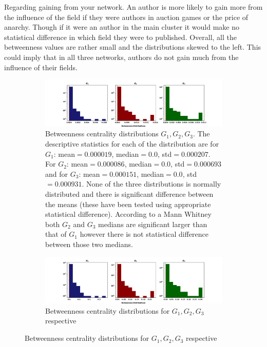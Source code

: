 \documentclass{article}
\theoremstyle{definition}
\begin{document}
Regarding gaining from your network. An author is more likely to gain more
from the influence of the field if they were authors in auction games or the
price of anarchy. Though if it were an author in the main cluster it would make
no statistical difference in which field they were to published. Overall,
all the betweenness values are rather small and the distributions skewed to the
left. This could imply that in all three networks, authors do not gain much from
the influence of their fields.

\begin{figure}[!hbtp]
    \centering
    \begin{subfigure}{\textwidth}\centering
        \includegraphics[width=\textwidth]{./assets/images/betweeness_distributions.pdf}
        \caption{Betweenness centrality distributions \(G_1, G_2, G_3\). The descriptive
        statistics for each of the distribution are for \(G_1\): mean\(=0.000019\),
        median\(=0.0\), std\(=0.000207\). For \(G_2\): mean\(=0.000086\), median\(=0.0\),
        std\(=0.000693\) and for \(G_3\): mean\(=0.000151\), median\(=0.0\), std\(=0.000931\).
        None of the three distributions is normally distributed and there is
        significant difference between the means (these have been tested using
        appropriate statistical difference). According to a Mann Whitney both
        \(G_2\) and \(G_3\) medians are significant larger than that of \(G_1\) however there
        is not statistical difference between those two medians.}\label{fig:betweenness_dist}
    \end{subfigure}
    \begin{subfigure}{\textwidth}\centering
        \includegraphics[width=\textwidth]{./assets/images/betweeness_distributions_clusters.pdf}
        \caption{Betweenness centrality distributions for \(G_1, G_2, G_3\) respective
}
\end{subfigure}
\end{figure}
\end{document}

